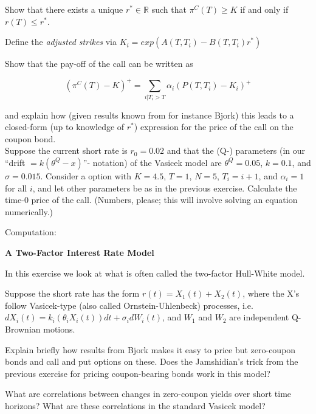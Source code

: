 \documentclass[a4paper]{article}
\begin{document}
Show that there exists a unique $r^{\ast} \in\mathbb{R}$ such that $\pi^{C}\left(T\right)\geq K$ if and only if $r\left(T\right)\leq r^{\ast}$.

Define the \textit{adjusted strikes} via $K_i = exp\left(A\left(T, T_i\right)-B\left(T, T_i\right)r^{\ast}\right)$

Show that the pay-off of the call can be written as 

$$\left(\pi^{C}\left(T\right)-K\right)^{+}=\sum_{i|T_i > T}\alpha_i\left(P\left(T,T_i\right)-K_i\right)^{+}$$

and explain how (given results known from for instance Bjork) this leads to a closed-form (up to knowledge of $r^{\ast}$) expression for the price of the call on the coupon bond.\\

Suppose the current short rate is $r_0=0.02$ and that the (Q-) parameters (in our ``drift $=k\left(\theta^{Q}-x\right)$''- notation) of the Vasicek model are $\theta^{Q}=0.05$, $k=0.1$, and $\sigma=0.015$. Consider a option with $K = 4.5$, $T = 1$, $N = 5$, $T_i = i+1$, and $\alpha_i = 1$ for all $i$, and let other parameters be as in the previous exercise. Calculate the time-0 price of the call. (Numbers, please; this will involve solving an equation numerically.)

\vspace{0.2cm}
Computation:

\vspace{0.4cm}
{\Large{\textbf{A Two-Factor Interest Rate Model}}}\\
\vspace{0.2cm}

In this exercise we look at what is often called the two-factor Hull-White model.


Suppose the short rate has the form $r(t) = X_1\left(t\right)+X_2\left(t\right)$, where the X's follow Vasicek-type (also called Ornstein-Uhlenbeck) processes, i.e. $dX_{i}\left(t\right) = k_i\left(\theta_i X_i\left(t\right)\right)dt + \sigma_i dW_{i}\left(t\right)$, and $W_{1}$ and $W_{2}$ are independent Q-Brownian motions.


Explain briefly how results from Bjork makes it easy to price but zero-coupon bonds and call and put options on these. Does the Jamshidian's trick from the previous exercise for pricing coupon-bearing bonds work in this model?

What are correlations between changes in zero-coupon yields over short time horizons? What are these correlations in the standard Vasicek model?
\end{document}
